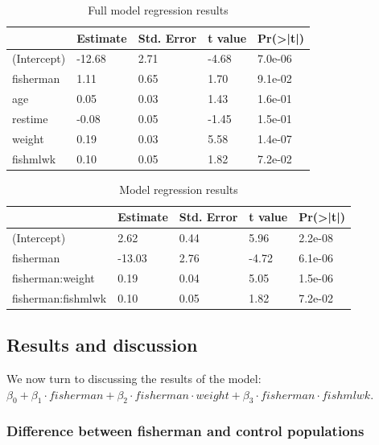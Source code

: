 \documentclass[12pt,]{article}
\begin{document}
\begin{table}[t]

\caption{\label{tab:unnamed-chunk-12}Full model regression results}
\centering
\begin{tabular}{l|l|l|l|l}
\hline
  & Estimate & Std. Error & t value & Pr(>|t|)\\
\hline
\rowcolor{gray!6}  (Intercept) & -12.68 & 2.71 & -4.68 & 7.0e-06\\
\hline
fisherman & 1.11 & 0.65 & 1.70 & 9.1e-02\\
\hline
\rowcolor{gray!6}  age & 0.05 & 0.03 & 1.43 & 1.6e-01\\
\hline
restime & -0.08 & 0.05 & -1.45 & 1.5e-01\\
\hline
\rowcolor{gray!6}  weight & 0.19 & 0.03 & 5.58 & 1.4e-07\\
\hline
fishmlwk & 0.10 & 0.05 & 1.82 & 7.2e-02\\
\hline
\end{tabular}
\end{table}

\begin{table}[t]

\caption{\label{tab:unnamed-chunk-14}Model regression results}
\centering
\begin{tabular}{l|l|l|l|l}
\hline
  & Estimate & Std. Error & t value & Pr(>|t|)\\
\hline
\rowcolor{gray!6}  (Intercept) & 2.62 & 0.44 & 5.96 & 2.2e-08\\
\hline
fisherman & -13.03 & 2.76 & -4.72 & 6.1e-06\\
\hline
\rowcolor{gray!6}  fisherman:weight & 0.19 & 0.04 & 5.05 & 1.5e-06\\
\hline
fisherman:fishmlwk & 0.10 & 0.05 & 1.82 & 7.2e-02\\
\hline
\end{tabular}
\end{table}

\subsection{Results and discussion}\label{results-and-discussion}

We now turn to discussing the results of the model:
\(\beta_0 + \beta_1 \cdot fisherman + \beta_2 \cdot fisherman \cdot weight + \beta_3 \cdot fisherman \cdot fishmlwk\).

\subsubsection{Difference between fisherman and control
populations}\label{difference-between-fisherman-and-control-populations}
\end{document}
